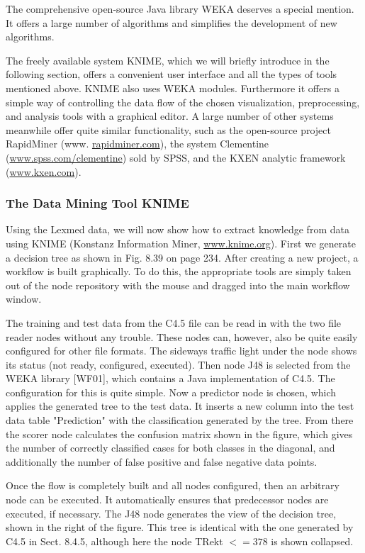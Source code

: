 \documentclass[10pt]{article}
\begin{document}
The comprehensive open-source Java library WEKA deserves a special mention. It offers a large number of algorithms and simplifies the development of new algorithms.

The freely available system KNIME, which we will briefly introduce in the following section, offers a convenient user interface and all the types of tools mentioned above. KNIME also uses WEKA modules. Furthermore it offers a simple way of controlling the data flow of the chosen visualization, preprocessing, and analysis tools with a graphical editor. A large number of other systems meanwhile offer quite similar functionality, such as the open-source project RapidMiner (www. \href{http://rapidminer.com}{rapidminer.com}), the system Clementine (\href{http://www.spss.com/clementine}{www.spss.com/clementine}) sold by SPSS, and the KXEN analytic framework (\href{http://www.kxen.com}{www.kxen.com}).

\subsubsection*{The Data Mining Tool KNIME}
Using the Lexmed data, we will now show how to extract knowledge from data using KNIME (Konstanz Information Miner, \href{http://www.knime.org}{www.knime.org}). First we generate a decision tree as shown in Fig. 8.39 on page 234. After creating a new project, a workflow is built graphically. To do this, the appropriate tools are simply taken out of the node repository with the mouse and dragged into the main workflow window.

The training and test data from the C4.5 file can be read in with the two file reader nodes without any trouble. These nodes can, however, also be quite easily configured for other file formats. The sideways traffic light under the node shows its status (not ready, configured, executed). Then node J48 is selected from the WEKA library [WF01], which contains a Java implementation of C4.5. The configuration for this is quite simple. Now a predictor node is chosen, which applies the generated tree to the test data. It inserts a new column into the test data table "Prediction" with the classification generated by the tree. From there the scorer node calculates the confusion matrix shown in the figure, which gives the number of correctly classified cases for both classes in the diagonal, and additionally the number of false positive and false negative data points.

Once the flow is completely built and all nodes configured, then an arbitrary node can be executed. It automatically ensures that predecessor nodes are executed, if necessary. The J48 node generates the view of the decision tree, shown in the right of the figure. This tree is identical with the one generated by C4.5 in Sect. 8.4.5, although here the node TRekt $<=378$ is shown collapsed.
\end{document}
